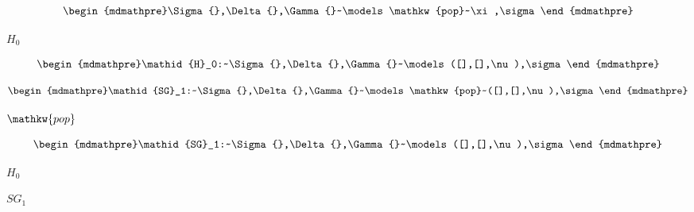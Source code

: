 \documentclass[10pt]{book}
\begin{document}
\begin{mdSnippets}
\begin{mdDisplaySnippet}[6a74cb6b28c2ba20850ee942f1de51bc]
\[\]%
\end{mdDisplaySnippet}%
\begin{mdDisplaySnippet}[b31c6954f21c52d0b60122a3bb10c172]%
\[%
\begin{mdmathpre}%
\Sigma{},\Delta{},\Gamma{}~\models \mathkw{pop}~\xi,\sigma
\end{mdmathpre}%
\]%
\end{mdDisplaySnippet}%
\begin{mdInlineSnippet}[e65765bedcabe42c66ec93228769e82a]%
$H_0$\end{mdInlineSnippet}%
\begin{mdDisplaySnippet}%
\[%
\begin{mdmathpre}%
\mathid{H}_0:~\Sigma{},\Delta{},\Gamma{}~\models ([],[],\nu),\sigma
\end{mdmathpre}%
\]%
\end{mdDisplaySnippet}%
\begin{mdDisplaySnippet}%
\[%
\begin{mdmathpre}%
\mathid{SG}_1:~\Sigma{},\Delta{},\Gamma{}~\models \mathkw{pop}~([],[],\nu),\sigma
\end{mdmathpre}%
\]%
\end{mdDisplaySnippet}%
\begin{mdInlineSnippet}[689fe69f9878c8b4adbc8c6342b2a858]%
$\mathkw{pop}$\end{mdInlineSnippet}%
\begin{mdDisplaySnippet}%
\[%
\begin{mdmathpre}%
\mathid{SG}_1:~\Sigma{},\Delta{},\Gamma{}~\models ([],[],\nu),\sigma
\end{mdmathpre}%
\]%
\end{mdDisplaySnippet}%
\begin{mdInlineSnippet}[e65765bedcabe42c66ec93228769e82a]%
$H_0$\end{mdInlineSnippet}%
\begin{mdInlineSnippet}[34b9b497f78f1e6e6843dc627bbbf47e]%
$SG_1$\end{mdInlineSnippet}%
\begin{mdDisplaySnippet}[fa0f1d88f71c6058c8fb331fefffbc1c]%

\end{mdDisplaySnippet}
\end{mdSnippets}
\end{document}
